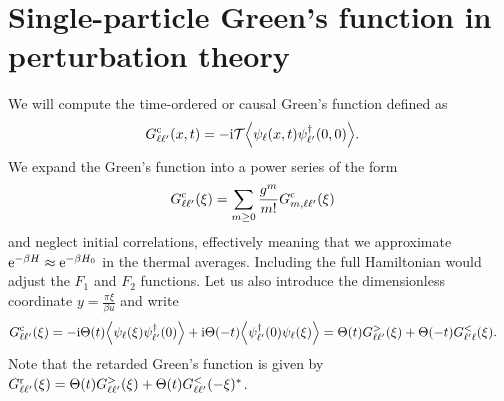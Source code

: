 \documentclass[english, parskip=full]{scrartcl}
\begin{document}
\section{Single-particle Green's function in perturbation theory}
We will compute the time-ordered or causal Green's function defined as
\begin{align}
G_{\ell\ell'}^\c(x,t) &= -\i\mathcal{T} \bra*{\psi_\ell(x,t) \psi_{\ell'}^\dagger(0,0)}.
\end{align}
We expand the Green's function into a power series of the form
\begin{align}
G_{\ell\ell'}^{\text{c}}(\xi) &= \sum_{m\ge 0} \frac{g^m}{m!} G_{m,\ell\ell'}^{\text{c}}(\xi)
\end{align}
and neglect initial correlations, effectively meaning that we approximate $\text{e}^{-\beta H} \approx \text{e}^{-\beta H_0}$ in the thermal averages.
Including the full Hamiltonian would adjust the $F_1$ and $F_2$ functions.
Let us also introduce the dimensionless coordinate $y = \frac{\pi \xi}{\beta u}$ and write
\begin{align}
G_{\ell\ell'}^\c(\xi) &= -\i\Theta(t) \bra*{\psi_\ell(\xi) \psi_{\ell'}^\dagger(0)} + \i\Theta(-t) \bra*{\psi_{\ell'}^\dagger(0) \psi_\ell(\xi)} = \Theta(t) G_{\ell\ell'}^>(\xi) + \Theta(-t) G_{\ell'\ell}^<(\xi).
\end{align}
Note that the retarded Green's function is given by $G_{\ell\ell'}^{\text{r}}(\xi) = \Theta(t) G_{\ell\ell'}^>(\xi) + \Theta(t) G_{\ell\ell'}^<(-\xi)^\ast$.
\end{document}
